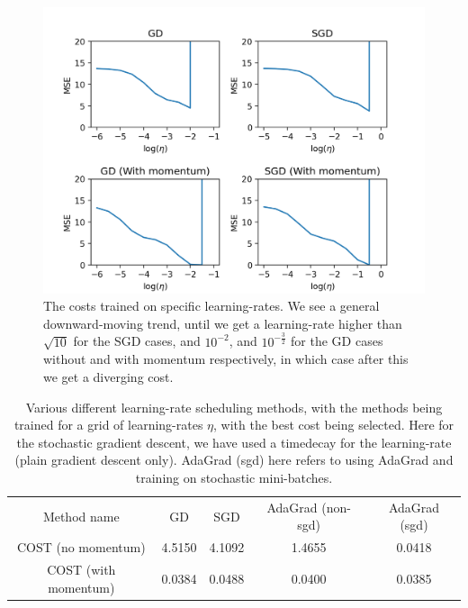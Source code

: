 \documentclass{article}
\begin{document}
\begin{figure}
      \centering
      \includegraphics[scale=0.8]{optimizers_plot}
      \caption{The costs trained on specific learning-rates. We see a general
            downward-moving trend, until we get a learning-rate higher than
            $\sqrt{10}$ for the SGD cases, and $10^{-2}$, and
            $10^{-\frac{3}{2}}$ for the GD cases without and with momentum
            respectively, in which case after this we get a diverging cost.}
      \label{learningrate-cost-plot}
\end{figure}

\begin{table}
      \centering
      \begin{tabular}{| c | c | c | c | c |}
            Method name          & GD     & SGD    & AdaGrad (non-sgd) & AdaGrad (sgd) \\
            COST (no momentum)   & 4.5150 & 4.1092 & 1.4655            & 0.0418        \\
            COST (with momentum) & 0.0384 & 0.0488 & 0.0400            & 0.0385
      \end{tabular}
      \caption{Various different learning-rate scheduling methods, with the
            methods being trained for a grid of learning-rates $\eta$, with the best
            cost being selected. Here for the stochastic gradient descent, we
            have used a timedecay for the learning-rate (plain gradient descent
            only). AdaGrad (sgd) here refers to using AdaGrad and training on
            stochastic mini-batches.}
      \label{gradmethods-comparison}
\end{table}
\end{document}
